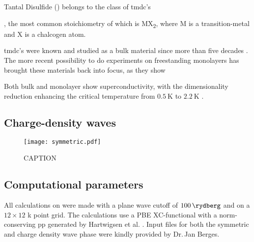 \documentclass[main.tex]{subfiles}
\begin{document}
Tantal Disulfide (\TaS) belongs to the class of \acrfull{tmdc}'s

, the most common stoichiometry of which is MX\textsubscript{2}, where M is a transition-metal and X is a chalcogen atom.

\acrshort{tmdc}'s were known and studied as a bulk material since more than five decades \cite{wilson_transition_1969}.
The more recent possibility to do experiments on freestanding monolayers \cite{novoselov_two-dimensional_2005} has brought these materials back into focus, as they show 

Both bulk and monolayer \TaS show superconductivity, with the dimensionality reduction enhancing the critical temperature from \(\SI{0.5}{\kelvin}\) to \(\SI{2.2}{\kelvin}\) \cite{navarro-moratalla_enhanced_2016}.

\subsection{Charge-density waves}

\begin{figure}[ht!]
    \centering
    \texttt{[image: symmetric.pdf]}
    \caption{CAPTION}
\end{figure}



\subsection{Computational parameters}

All calculations on \TaS were made with a plane wave cutoff of \(\SI{100}{\rydberg}\) and on a \(12\times12\) k point grid.
The calculations use a PBE XC-functional with a norm-conserving \acrshort{pp} generated by Hartwigsen et al. \cite{hartwigsen_relativistic_1998}.
Input files for both the symmetric and charge density wave phase were kindly provided by Dr.\,Jan Berges.
\end{document}
